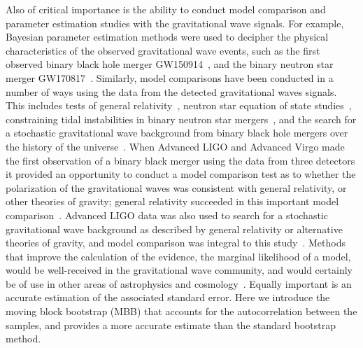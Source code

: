 \documentclass[aps,reprint,amsmath,amssymb,showpacs,showkeys]{revtex4-1}%
\newcommand{\jv}[1]{\textcolor{cyan}{JV: #1}}
\begin{document}
Also of critical importance is the ability to conduct model comparison and parameter estimation studies with the gravitational wave signals. For example, Bayesian parameter estimation methods were used to decipher the physical characteristics of the observed gravitational wave events, such as the first observed binary black hole merger GW150914~\cite{PhysRevLett.116.061102,PhysRevLett.116.241102,PhysRevX.6.041014,O1BBH}, and the binary neutron star merger GW170817~\cite{PhysRevLett.119.161101,Abbott:2018wiz}. Similarly, model comparisons have been conducted in a number of ways using the data from the detected gravitational waves signals. This includes tests of general relativity~\cite{PhysRevLett.116.221101}, neutron star equation of state studies~\cite{PhysRevLett.119.161101,Abbott:2018exr}, constraining tidal instabilities in binary neutron star mergers~\cite{Weinberg:2018icl}, and the search for a stochastic gravitational wave background from binary black hole mergers over the history of the universe~\cite{PhysRevX.8.021019}. When Advanced LIGO and Advanced Virgo made the first observation of a binary black merger using the data from three detectors it provided an opportunity to conduct a model comparison test as to whether the polarization of the gravitational waves was consistent with general relativity, or other theories of gravity; general relativity succeeded in this important model comparison~\cite{PhysRevLett.119.141101}. Advanced LIGO data was also used to search for a stochastic gravitational wave background as described by general relativity or alternative theories of gravity, and model comparison was integral to this study~\cite{PhysRevX.7.041058,PhysRevLett.120.201102}. Methods that  improve the calculation of the evidence, the marginal likelihood of a model, would be well-received in the gravitational wave community, and would certainly be of use in other areas of astrophysics and cosmology~\cite{doi:10.1146/annurev-astro-082214-122339}. Equally important is an accurate estimation of the associated standard error. Here we introduce the moving block bootstrap (MBB) that accounts for the autocorrelation between the samples, and provides a more accurate estimate than the standard bootstrap method.

\end{document}
